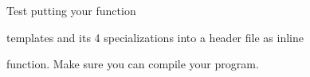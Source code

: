 Test putting your  function

templates and its 4 specializations into a header file as inline

function. Make sure you can compile your program.


